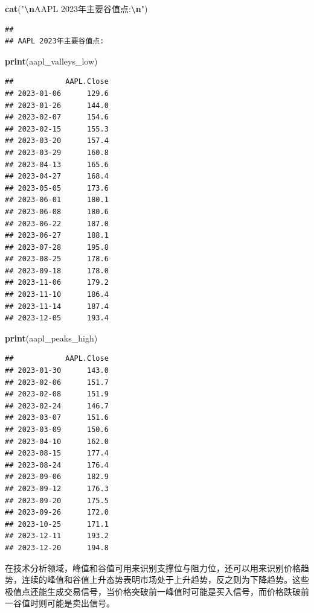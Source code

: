 \documentclass[]{ctexbook}
\newenvironment{Shaded}{\begin{snugshade}}{\end{snugshade}}
\newcommand{\FunctionTok}[1]{\textcolor[rgb]{0.13,0.29,0.53}{\textbf{#1}}}
\newcommand{\NormalTok}[1]{#1}
\newcommand{\SpecialCharTok}[1]{\textcolor[rgb]{0.81,0.36,0.00}{\textbf{#1}}}
\newcommand{\StringTok}[1]{\textcolor[rgb]{0.31,0.60,0.02}{#1}}
\begin{document}
\begin{Shaded}
\begin{Highlighting}[]
\FunctionTok{cat}\NormalTok{(}\StringTok{"}\SpecialCharTok{\textbackslash{}n}\StringTok{AAPL 2023年主要谷值点:}\SpecialCharTok{\textbackslash{}n}\StringTok{"}\NormalTok{)}
\end{Highlighting}
\end{Shaded}

\begin{verbatim}
## 
## AAPL 2023年主要谷值点:
\end{verbatim}

\begin{Shaded}
\begin{Highlighting}[]
\FunctionTok{print}\NormalTok{(aapl\_valleys\_low)}
\end{Highlighting}
\end{Shaded}

\begin{verbatim}
##            AAPL.Close
## 2023-01-06      129.6
## 2023-01-26      144.0
## 2023-02-07      154.6
## 2023-02-15      155.3
## 2023-03-20      157.4
## 2023-03-29      160.8
## 2023-04-13      165.6
## 2023-04-27      168.4
## 2023-05-05      173.6
## 2023-06-01      180.1
## 2023-06-08      180.6
## 2023-06-22      187.0
## 2023-06-27      188.1
## 2023-07-28      195.8
## 2023-08-25      178.6
## 2023-09-18      178.0
## 2023-11-06      179.2
## 2023-11-10      186.4
## 2023-11-14      187.4
## 2023-12-05      193.4
\end{verbatim}

\begin{Shaded}
\begin{Highlighting}[]
\FunctionTok{print}\NormalTok{(aapl\_peaks\_high)}
\end{Highlighting}
\end{Shaded}

\begin{verbatim}
##            AAPL.Close
## 2023-01-30      143.0
## 2023-02-06      151.7
## 2023-02-08      151.9
## 2023-02-24      146.7
## 2023-03-07      151.6
## 2023-03-09      150.6
## 2023-04-10      162.0
## 2023-08-15      177.4
## 2023-08-24      176.4
## 2023-09-06      182.9
## 2023-09-12      176.3
## 2023-09-20      175.5
## 2023-09-26      172.0
## 2023-10-25      171.1
## 2023-12-11      193.2
## 2023-12-20      194.8
\end{verbatim}

在技术分析领域，峰值和谷值可用来识别支撑位与阻力位，还可以用来识别价格趋势，连续的峰值和谷值上升态势表明市场处于上升趋势，反之则为下降趋势。这些极值点还能生成交易信号，当价格突破前一峰值时可能是买入信号，而价格跌破前一谷值时则可能是卖出信号。
\end{document}
